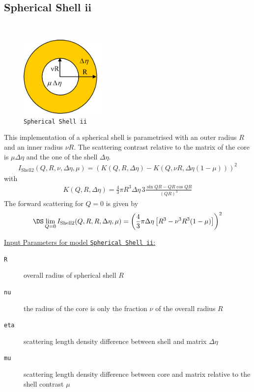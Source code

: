 \clearpage
\subsection{Spherical Shell ii}
\label{sect:spherical_shell_ii} ~\\

\begin{figure}[htb]
\begin{center}
\includegraphics[width=0.38\textwidth]{../images/form_factor/spheres/shell2.png}
\end{center}
\caption{\texttt{Spherical Shell ii}} \label{fig:shell2}
\end{figure}
This implementation of a spherical shell is parametrised with an outer radius $R$ and an inner
radius $\nu R$. The scattering contrast relative to the matrix of the core is $ \mu \Delta \eta$
and the one of the shell $\Delta\eta$.
\begin{align}
I_\text{Shell2}(Q,R,\nu,\Delta\eta,\mu)=
\left(K(Q,R,\Delta\eta)-K(Q,\nu R,\Delta\eta(1-\mu))\right)^2
\end{align}
with
\begin{align}
 K(Q,R,\Delta\eta) = \frac{4}{3}\pi R^3 \Delta\eta \, 3 \frac{\sin QR - QR \cos QR}{(QR)^3}
\end{align}
The forward scattering for $Q=0$ is given by
$$
\DS \lim_{Q=0}I_\text{Shell2}(Q,R,R,\Delta\eta,\mu) =
\left(\frac{4}{3}\pi \Delta\eta \left[ R^3 - \nu^3
R^3(1-\mu)\right]\right)^2
$$

\vspace{5mm}
\noindent \uline{Input Parameters for model \texttt{Spherical Shell ii}:}
\begin{description}
\item[\texttt{R}] overall radius of spherical shell $R$
\item[\texttt{nu}] the radius of the core is only the fraction $\nu$ of the overall radius  $R$
\item[\texttt{eta}] scattering length density difference between shell and matrix $\Delta\eta$
\item[\texttt{mu}] scattering length density difference between core and matrix relative to the shell contrast $\mu$
\end{description}

